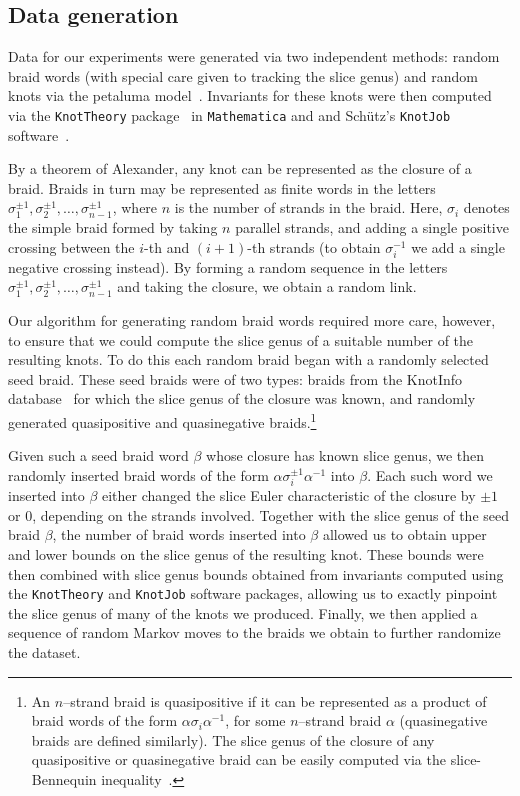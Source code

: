\documentclass[11pt]{article}
\numberwithin{equation}{section}
\begin{document}
\subsection{Data generation}
Data for our experiments were generated via two independent methods: random braid words (with special care given to tracking the slice genus) and random knots via the petaluma model~\cite{even2018distribution}.
Invariants for these knots were then computed via the \texttt{KnotTheory} package~\cite{KnotAtlas,KnotTheory} in \texttt{Mathematica} and and Sch\"{u}tz's \texttt{KnotJob} software~\cite{KnotJob}.

By a theorem of Alexander, any knot can be represented as the closure of a braid.
Braids in turn may be represented as finite words in the letters $\sigma_1^{\pm 1}, \sigma_2^{\pm 1}, \ldots, \sigma_{n-1}^{\pm 1}$, where $n$ is the number of strands in the braid.
Here, $\sigma_i$ denotes the simple braid formed by taking $n$ parallel strands, and adding a single positive crossing between the $i$-th and $(i+1)$-th strands (to obtain $\sigma_i^{-1}$ we add a single negative crossing instead).
By forming a random sequence in the letters $\sigma_1^{\pm 1}, \sigma_2^{\pm 1}, \ldots, \sigma_{n-1}^{\pm 1}$ and taking the closure, we obtain a random link.

Our algorithm for generating random braid words required more care, however, to ensure that we could compute the slice genus of a suitable number of the resulting knots.
To do this each random braid began with a randomly selected seed braid.
These seed braids were of two types: braids from the KnotInfo database~\cite{knotinfo} for which the slice genus of the closure was known, and randomly generated quasipositive and quasinegative braids.\footnote{
An $n$--strand braid is quasipositive if it can be represented as a product of braid words of the form $\alpha \sigma_i \alpha^{-1}$, for some $n$--strand braid $\alpha$ (quasinegative braids are defined similarly).
The slice genus of the closure of any quasipositive or quasinegative braid can be easily computed via the slice-Bennequin inequality~\cite{rudolph1993quasipositivity}.}

Given such a seed braid word $\beta$ whose closure has known slice genus, we then randomly inserted braid words of the form $\alpha \sigma_i^{\pm 1} \alpha^{-1}$ into $\beta$.
Each such word we inserted into $\beta$ either changed the slice Euler characteristic of the closure by $\pm 1$ or $0$, depending on the strands involved.
Together with the slice genus of the seed braid $\beta$, the number of braid words inserted into $\beta$ allowed us to obtain upper and lower bounds on the slice genus of the resulting knot.
These bounds were then combined with slice genus bounds obtained from invariants computed using the \texttt{KnotTheory} and \texttt{KnotJob} software packages, allowing us to exactly pinpoint the slice genus of many of the knots we produced.
Finally, we then applied a sequence of random Markov moves to the braids we obtain to further randomize the dataset.
\end{document}
